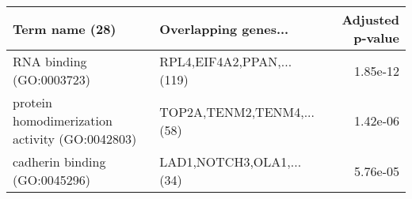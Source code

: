 \begin{tabular}{llr}
\toprule
                                Term name (28) &      Overlapping genes... &  Adjusted p-value \\
\midrule
                      RNA binding (GO:0003723) & RPL4,EIF4A2,PPAN,...(119) &          1.85e-12 \\
protein homodimerization activity (GO:0042803) & TOP2A,TENM2,TENM4,...(58) &          1.42e-06 \\
                 cadherin binding (GO:0045296) &  LAD1,NOTCH3,OLA1,...(34) &          5.76e-05 \\
\bottomrule
\end{tabular}
